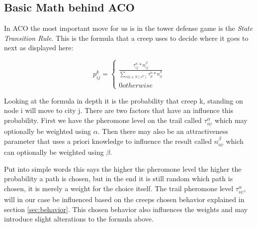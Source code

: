 \subsection{Basic Math behind ACO}

In ACO the most important move for us is in the tower defense game is the \textit{State Transition Rule}. This is the formula that a creep uses to decide where it goes to next as displayed here\cite{dorigo2006ant}:

\begin{equation}
p^k_{ij}=
\begin{cases}
\frac{\tau^\alpha_{ij}*n^\beta_{ij}}{\sum_{ciL\in N(s^P)}\tau^\alpha_{il}*n^\beta_{il}} \\
0 otherwise
\end{cases}
\end{equation}

Looking at the formula in depth it is the probability that creep k, standing on node i will move to city j\cite{maniezzo2002ant}.
There are two factors that have an influence this probability.
First we have the pheromone level on the trail called $\tau^\alpha_{i\psi}$ which may optionally be weighted using $\alpha$.
Then there may also be an attractiveness parameter that uses a priori knowledge to influence the result called $n^\beta_{i\psi}$ which can optionally be weighted using $\beta$\cite{dorigo2006ant}.

Put into simple words this says the higher the pheromone level the higher the probability a path is chosen, but in the end it is still random which path is chosen, it is merely a weight for the choice itself.
The trail pheromone level $\tau^\alpha_{i\psi}$, will in our case be influenced based on the creeps chosen behavior explained in section \ref{sec:behavior}. This chosen behavior also influences the weights and may introduce slight alterations to the formula above.